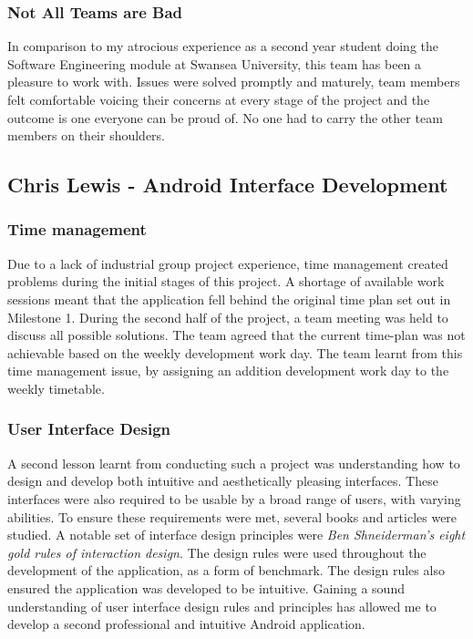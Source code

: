 \documentclass[11pt,a4paper]{report}
\begin{document}
\subsubsection{Not All Teams are Bad}
In comparison to my atrocious experience as a second year student doing the Software Engineering module at Swansea University, this team has been a pleasure to work with. Issues were solved promptly and maturely, team members felt comfortable voicing their concerns at every stage of the project and the outcome is one everyone can be proud of. No one had to carry the other team members on their shoulders.



\subsection{Chris Lewis - Android Interface Development}

\subsubsection{Time management}
Due to a lack of industrial group project experience, time management created problems during the initial stages of this project. A shortage of available work sessions meant that the application fell behind the original time plan set out in Milestone 1. During the second half of the project, a team meeting was held to discuss all possible solutions. The team agreed that the current time-plan was not achievable based on the weekly development work day. The team learnt from this time management issue, by assigning an addition development work day to the weekly timetable.

\subsubsection{User Interface Design}
A second lesson learnt from conducting such a project was understanding how to design and develop both intuitive and aesthetically pleasing interfaces. These interfaces were also required to be usable by a broad range of users, with varying abilities. To ensure these requirements were met, several books and articles were studied. A notable set of interface design principles were \emph{Ben Shneiderman's eight gold rules of interaction design}. The design rules were used throughout the development of the application, as a form of benchmark. The design rules also ensured the application was developed to be intuitive. Gaining a sound understanding of user interface design rules and principles has allowed me to develop a second professional and intuitive Android application.   
\end{document}
